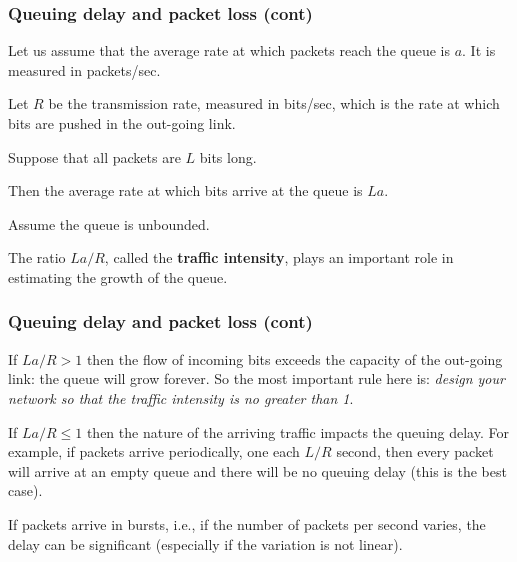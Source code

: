 %
\begin{frame}
\frametitle{Queuing delay and packet loss (cont)}

Let us assume that the average rate at which packets reach the queue
is \(a\). It is measured in packets/sec.

\bigskip

Let \(R\) be the transmission rate, measured in bits/sec, which is the
rate at which bits are pushed in the out-going link.

\bigskip

Suppose that all packets are \(L\) bits long.

\bigskip

Then the average rate at which bits arrive at the queue is \(La\).

\bigskip

Assume the queue is unbounded.

\bigskip

The ratio \(La/R\), called the \textbf{traffic intensity}, plays an
important role in estimating the growth of the queue.

\end{frame}

%
\begin{frame}
\frametitle{Queuing delay and packet loss (cont)}

If \(La/R > 1\) then the flow of incoming bits exceeds the capacity of
the out-going link: the queue will grow forever. So the most important
rule here is: \emph{design your network so that the traffic intensity
is no greater than 1}.

\bigskip

If \(La/R \leqslant 1\) then the nature of the arriving traffic
impacts the queuing delay. For example, if packets arrive
periodically, one each \(L/R\) second, then every packet will arrive
at an empty queue and there will be no queuing delay (this is the best
case).

\bigskip

If packets arrive in bursts, i.e., if the number of packets per second
varies, the delay can be significant (especially if the variation is
not linear).

\end{frame}

